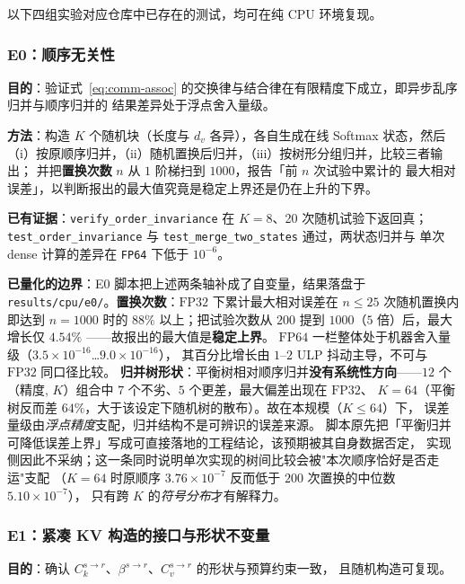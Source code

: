以下四组实验对应仓库中已存在的测试，均可在纯 CPU 环境复现。

\subsubsection{E0：顺序无关性}

\textbf{目的}：验证式~\eqref{eq:comm-assoc} 的交换律与结合律在有限精度下成立，即异步乱序归并与顺序归并的
结果差异处于浮点舍入量级。

\textbf{方法}：构造 $K$ 个随机块（长度与 $d_v$ 各异），各自生成在线 Softmax 状态，然后
（i）按原顺序归并，（ii）随机置换后归并，（iii）按树形分组归并，比较三者输出；
并把\textbf{置换次数} $n$ 从 $1$ 阶梯扫到 $1000$，报告「前 $n$ 次试验中累计的
最大相对误差」，以判断报出的最大值究竟是稳定上界还是仍在上升的下界。

\textbf{已有证据}：\texttt{verify\_order\_invariance} 在 $K=8$、20 次随机试验下返回真；
\texttt{test\_order\_invariance} 与 \texttt{test\_merge\_two\_states} 通过，两状态归并与
单次 dense 计算的差异在 \texttt{FP64} 下低于 $10^{-6}$。

\textbf{已量化的边界}：E0 脚本把上述两条轴补成了自变量，结果落盘于
\texttt{results/cpu/e0/}。\textbf{置换次数}：$\mathrm{FP32}$ 下累计最大相对误差在
$n\le25$ 次随机置换内即达到 $n=1000$ 时的 $88\%$ 以上；把试验次数从 $200$ 提到
$1000$（$5$ 倍）后，最大增长仅 $4.54\%$ ——故报出的最大值是\textbf{稳定上界}。
$\mathrm{FP64}$ 一栏整体处于机器舍入量级（$3.5\times10^{-16}$…$9.0\times10^{-16}$），
其百分比增长由 $1$--$2$ ULP 抖动主导，不可与 $\mathrm{FP32}$ 同口径比较。
\textbf{归并树形状}：平衡树相对顺序归并\textbf{没有系统性方向}——$12$ 个
（精度, $K$）组合中 $7$ 个不劣、$5$ 个更差，最大偏差出现在 $\mathrm{FP32}$、
$K=64$（平衡树反而差 $64\%$，大于该设定下随机树的散布）。故在本规模（$K\le64$）下，
误差量级由\emph{浮点精度}支配，归并结构不是可辨识的误差来源。
脚本原先把「平衡归并可降低误差上界」写成可直接落地的工程结论，该预期被其自身数据否定，
实现侧因此不采纳；这一条同时说明单次实现的树间比较会被"本次顺序恰好是否走运"支配
（$K=64$ 时原顺序 $3.76\times10^{-7}$ 反而低于 $200$ 次置换的中位数 $5.10\times10^{-7}$），
只有跨 $K$ 的\emph{符号分布}才有解释力。

\subsubsection{E1：紧凑 KV 构造的接口与形状不变量}

\textbf{目的}：确认 $C_k^{s\to r}$、$\beta^{s\to r}$、$C_v^{s\to r}$ 的形状与预算约束一致，
且随机构造可复现。

